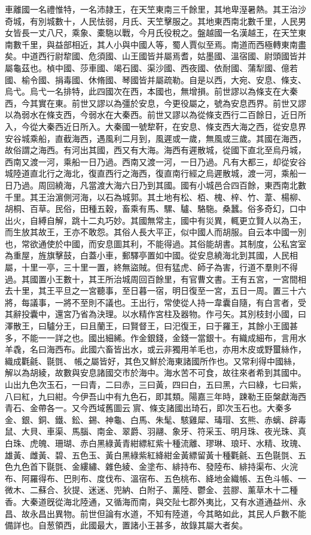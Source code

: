 \begin{pinyinscope}
車離國一名禮惟特，一名沛隷王，在天笁東南三千餘里，其地卑溼暑熱。其王治沙奇城，有別城數十，人民怯弱，月氏、天笁擊服之。其地東西南北數千里，人民男女皆長一丈八尺，乘象、橐駞以戰，今月氏役稅之。盤越國一名漢越王，在天笁東南數千里，與益部相近，其人小與中國人等，蜀人賈似至焉。南道而西極轉東南盡矣。中道西行尉犂國、危須國、山王國皆并屬焉耆，姑墨國、溫宿國、尉頭國皆并屬龜茲也。楨中國、莎車國、竭石國、渠沙國、西夜國、依耐國、蒲犁國、億若國、榆令國、捐毒國、休脩國、琴國皆并屬疏勒。自是以西，大宛、安息、條支、烏弋。烏弋一名排特，此四國次在西，本國也，無增損。前世謬以為條支在大秦西，今其實在東。前世又謬以為彊於安息，今更役屬之，號為安息西界。前世又謬以為弱水在條支西，今弱水在大秦西。前世又謬以為從條支西行二百餘日，近日所入，今從大秦西近日所入。大秦國一號犂靬，在安息、條支西大海之西，從安息界安谷城乘船，直截海西，遇風利二月到，風遲或一歲，無風或三歲。其國在海西，故俗謂之海西。有河出其國，西又有大海。海西有遲散城，從國下直北至烏丹城，西南又渡一河，乘船一日乃過。西南又渡一河，一日乃過。凡有大都三，却從安谷城陸道直北行之海北，復直西行之海西，復直南行經之烏遲散城，渡一河，乘船一日乃過。周回繞海，凡當渡大海六日乃到其國。國有小城邑合四百餘，東西南北數千里。其王治濵側河海，以石為城郭。其土地有松、栢、槐、梓、竹、葦、楊柳、胡桐、百草。民俗，田種五穀，畜乘有馬、騾、驢、駱駞。桑蠶。俗多奇幻，口中出火，自縛自解，跳十二丸巧妙。其國無常主，國中有災異，輒更立賢人以為王，而生放其故王，王亦不敢怨。其俗人長大平正，似中國人而胡服。自云本中國一別也，常欲通使於中國，而安息圖其利，不能得過。其俗能胡書。其制度，公私宮室為重屋，旌旗擊鼓，白蓋小車，郵驛亭置如中國。從安息繞海北到其國，人民相屬，十里一亭，三十里一置，終無盜賊。但有猛虎、師子為害，行道不羣則不得過。其國置小王數十，其王所治城周回百餘里，有官曹文書。王有五宮，一宮間相去十里，其王平旦之一宮聽事，至日暮一宿，明日復至一宮，五日一周。置三十六將，每議事，一將不至則不議也。王出行，常使從人持一韋囊自隨，有白言者，受其辭投囊中，還宮乃省為決理。以水精作宮柱及器物。作弓矢。其別枝封小國，曰澤散王，曰驢分王，曰且蘭王，曰賢督王，曰汜復王，曰于羅王，其餘小王國甚多，不能一一詳之也。國出細絺。作金銀錢，金錢一當銀十。有織成細布，言用水羊毳，名曰海西布。此國六畜皆出水，或云非獨用羊毛也，亦用木皮或野蠒絲作，織成氍毹、毾㲪、𦋺帳之屬皆好，其色又鮮於海東諸國所作也。又常利得中國絲，解以為胡綾，故數與安息諸國交市於海中。海水苦不可食，故往來者希到其國中。山出九色次玉石，一曰青，二曰赤，三曰黃，四曰白，五曰黑，六曰綠，七曰紫，八曰紅，九曰紺。今伊吾山中有九色石，即其類。陽嘉三年時，踈勒王臣槃獻海西青石、金帶各一。又今西域舊圖云𦋺賔、條支諸國出琦石，即次玉石也。大秦多金、銀、銅、鐵、鈆、錫、神龜、白馬、朱髦、駭雞犀、瑇瑁、玄熊、赤螭、辟毒鼠、大貝、車渠、馬腦、南金、翠爵、羽翮、象牙、符采玉、明月珠、夜光珠、真白珠、虎魄、珊瑚、赤白黑綠黃青紺縹紅紫十種流離、璆琳、琅玕、水精、玫瑰、雄黃、雌黃、碧、五色玉、黃白黑綠紫紅絳紺金黃縹留黃十種氍毹、五色毾㲪、五色九色首下毾㲪、金縷繡、雜色綾、金塗布、緋持布、發陸布、緋持渠布、火浣布、阿羅得布、巴則布、度伐布、溫宿布、五色桃布、絳地金織帳、五色斗帳、一微木、二蘇合、狄提、迷迷、兜納、白附子、薰陸、鬱金、芸膠、薰草木十二種香。大秦道旣從海北陸通，又循海而南，與交阯七郡外夷比，又有水道通益州、永昌、故永昌出異物。前世但論有水道，不知有陸道，今其略如此，其民人戶數不能備詳也。自葱領西，此國最大，置諸小王甚多，故錄其屬大者矣。


\end{pinyinscope}
